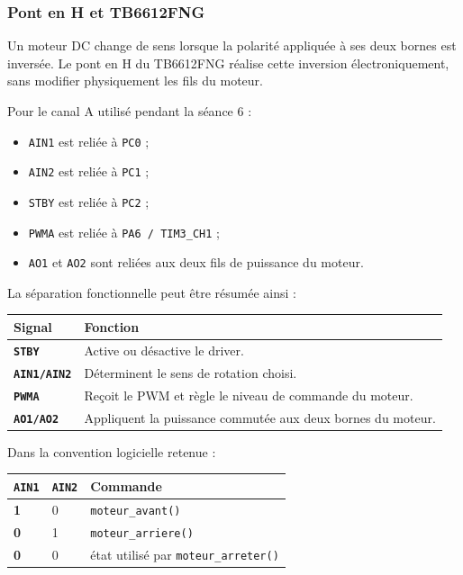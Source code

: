 \documentclass[11pt,a4paper]{article}
\begin{document}
	\subsubsection*{Pont en H et TB6612FNG}
	
	Un moteur DC change de sens lorsque la polarité appliquée à ses deux bornes est inversée. Le pont en H du TB6612FNG réalise cette inversion électroniquement, sans modifier physiquement les fils du moteur.
	
	Pour le canal A utilisé pendant la séance 6 :
	
	\begin{itemize}
		\item \texttt{AIN1} est reliée à \texttt{PC0} ;
		\item \texttt{AIN2} est reliée à \texttt{PC1} ;
		\item \texttt{STBY} est reliée à \texttt{PC2} ;
		\item \texttt{PWMA} est reliée à \texttt{PA6 / TIM3\_CH1} ;
		\item \texttt{AO1} et \texttt{AO2} sont reliées aux deux fils de puissance du moteur.
	\end{itemize}
	
	La séparation fonctionnelle peut être résumée ainsi :
	
	\begin{center}
		\begin{tabular}{>{\bfseries}p{4cm}p{8.5cm}}
			\toprule
			Signal & Fonction \\
			\midrule
			\texttt{STBY} & Active ou désactive le driver. \\
			\texttt{AIN1/AIN2} & Déterminent le sens de rotation choisi. \\
			\texttt{PWMA} & Reçoit le PWM et règle le niveau de commande du moteur. \\
			\texttt{AO1/AO2} & Appliquent la puissance commutée aux deux bornes du moteur. \\
			\bottomrule
		\end{tabular}
	\end{center}
	
	Dans la convention logicielle retenue :
	
	\begin{center}
		\begin{tabular}{>{\bfseries}p{3cm}p{3cm}p{5.5cm}}
			\toprule
			\texttt{AIN1} & \texttt{AIN2} & Commande \\
			\midrule
			1 & 0 & \texttt{moteur\_avant()} \\
			0 & 1 & \texttt{moteur\_arriere()} \\
			0 & 0 & état utilisé par \texttt{moteur\_arreter()} \\
			\bottomrule
		\end{tabular}
	\end{center}
	
\end{document}
